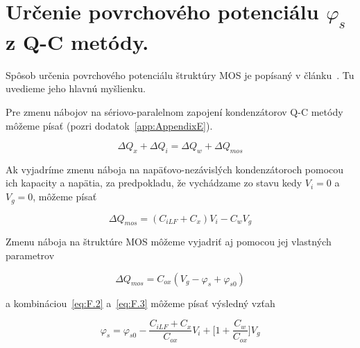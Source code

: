 
\chapter{Určenie povrchového potenciálu $\varphi_s$ z Q-C metódy.}\label{app:AppendixF}

Spôsob určenia povrchového potenciálu štruktúry MOS je popísaný v
článku~\cite{App.3}. Tu uvedieme jeho hlavnú myšlienku.

Pre zmenu nábojov na sériovo-paralelnom zapojení kondenzátorov Q-C
metódy môžeme písať (pozri dodatok~\ref{app:AppendixE}).

\begin{equation}\label{eq:F.1}
  \Delta Q_x + \Delta Q_i = \Delta Q_w + \Delta Q_{mos}
\end{equation}

Ak vyjadríme zmenu náboja na napäťovo-nezávislých kondenzátoroch
pomocou ich kapacity a napätia, za predpokladu, že vychádzame zo stavu
kedy $V_i=0$ a $V_g=0$, môžeme písať

\begin{equation}\label{eq:F.2}
  \Delta Q_{mos} = (C_{iLF} + C_{x})V_{i} - C_{w}V_{g}
\end{equation}

Zmenu náboja na štruktúre MOS môžeme vyjadriť aj pomocou jej vlastných
parametrov

\begin{equation}\label{eq:F.3}
  \Delta Q_{mos} = C_{ox}(V_{g} - \varphi_{s} + \varphi_{s0})
\end{equation}

a kombináciou~\ref{eq:F.2} a~\ref{eq:F.3} môžeme písať výsledný vzťah

\begin{equation}\label{eq:F.4}
  \varphi_{s} = \varphi_{s0} - \frac{C_{iLF} + C_{x}}{C_{ox}}V_i + {\Big[1 + \frac{C_{w}}{C_{ox}}\Big]}V_{g}
\end{equation}
